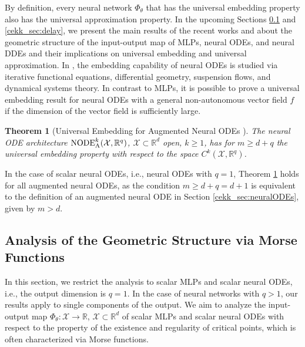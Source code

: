 \documentclass[10pt]{article}
\newcommand{\R}{{\mathbb R}}
\def\R{\mathbb{R}}
\newtheorem{theorem}{Theorem}[section]
\begin{document}
By definition, every neural network $\Phi_\theta$ that has the universal embedding property also has the universal approximation property. In the upcoming Sections \ref{cekk_sec:morse} and \ref{cekk_sec:delay}, we present the main results of the recent works \cite{KuehnKuntz2024} and \cite{KuehnKuntz2025} about the geometric structure of the input-output map of MLPs, neural ODEs, and neural DDEs and their implications on universal embedding and universal approximation. In \cite{KuehnKuntz2023}, the embedding capability of neural ODEs is studied via iterative functional equations, differential geometry, suspension flows, and dynamical systems theory. In contrast to MLPs, it is possible to prove a universal embedding result for neural ODEs with a general non-autonomous vector field $f$ if the dimension of the vector field is sufficiently large.

\begin{theorem}[Universal Embedding for Augmented Neural ODEs \cite{KuehnKuntz2023}]\label{cekk_th:universalembedding}    
	The neural ODE architecture $\textup{NODE}_\textup{A}^k(\mathcal{X},\R^q)$, $\mathcal{X} \subset \R^d$ open, $k\geq 1$, has for $m \geq d+q$ the universal embedding property with respect to the space $C^k(\mathcal{X},\R^q)$.
\end{theorem}

In the case of scalar neural ODEs, i.e., neural ODEs with $q=1$, Theorem \ref{cekk_th:universalembedding} holds for all augmented neural ODEs, as the condition $m\geq d+q =d+1$ is equivalent to the definition of an augmented neural ODE in Section \ref{cekk_sec:neuralODEs}, given by $m> d$.

\subsection{Analysis of the Geometric Structure via Morse Functions}
\label{cekk_sec:morse}

In this section, we restrict the analysis to scalar MLPs  and scalar neural ODEs,  i.e., the output dimension is $q = 1$. In the case of neural networks with $q>1$, our results apply to single components of the output. We aim to analyze the input-output map $\Phi_\theta:\mathcal{X}\rightarrow \R$, $\mathcal{X} \subset \R^d$ of scalar MLPs and scalar neural ODEs with respect to the property of the existence and regularity of critical points, which is often characterized via Morse functions. 
\end{document}
